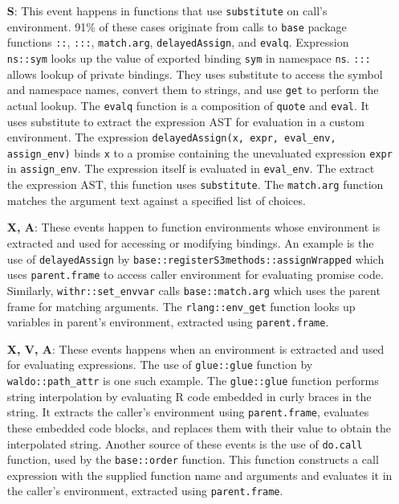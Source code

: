 \documentclass[10pt,review,sigplan,anonymous=true,authorversion=true,nonacm=true]{acmart}
\newcommand{\code}[1]{\lstinline |#1|\xspace}
\newcommand{\base}{\code{base}}
\begin{document}
\begin{itemize}
\item[\textbf{S}:] This event happens in functions that use \code{substitute} on
  call's environment. 91\% of these cases originate from calls to \base package
  functions \code{::}, \code{:::}, \code{match.arg}, \code{delayedAssign}, and
  \code{evalq}. Expression \code{ns::sym} looks up the value of exported binding
  \code{sym} in namespace \code{ns}. \code{:::} allows lookup of private
  bindings. They uses substitute to access the symbol and namespace names,
  convert them to strings, and use \code{get} to perform the actual lookup. The
  \code{evalq} function is a composition of \code{quote} and \code{eval}. It
  uses substitute to extract the expression AST for evaluation in a custom
  environment. The expression \code{delayedAssign(x, expr, eval_env,
    assign_env)} binds \code{x} to a promise containing the unevaluated
  expression \code{expr} in \code{assign_env}. The expression itself is
  evaluated in \code{eval_env}. The extract the expression AST, this function
  uses \code{substitute}. The \code{match.arg} function matches the argument
  text against a specified list of choices.

\item[\textbf{X, A}:] These events happen to function environments whose environment
  is extracted and used for accessing or modifying bindings. An example is the use
  of \code{delayedAssign} by \code{base::registerS3methods::assignWrapped} which
  uses \code{parent.frame} to access caller environment for evaluating promise
  code. Similarly, \code{withr::set_envvar} calls \code{base::match.arg} which
  uses the parent frame for matching arguments. The \code{rlang::env_get} function
  looks up variables in parent's environment, extracted using \code{parent.frame}.

\item[\textbf{X, V, A}:] These events happens when an environment is extracted
  and used for evaluating expressions. The use of \code{glue::glue} function by
  \code{waldo::path_attr} is one such example. The \code{glue::glue} function
  performs string interpolation by evaluating R code embedded in curly braces in
  the string. It extracts the caller's environment using \code{parent.frame},
  evaluates these embedded code blocks, and replaces them with their value to
  obtain the interpolated string. Another source of these events is the use of
  \code{do.call} function, used by the \code{base::order} function. This
  function constructs a call expression with the supplied function name and
  arguments and evaluates it in the caller's environment, extracted using
  \code{parent.frame}.


\end{itemize}
\end{document}
